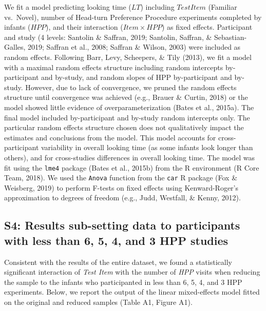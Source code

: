 \begin{appendix}
We fit a model predicting looking time (\(LT\)) including \(TestItem\)
(Familiar vs.~Novel), number of Head-turn Preference Procedure
experiments completed by infants (\(HPP\)), and their interaction
(\(Item \times HPP\)) as fixed effects. Participant and study (4 levels:
Santolin \& Saffran, 2019; Santolin, Saffran, \& Sebastian-Galles, 2019;
Saffran et al., 2008; Saffran \& Wilson, 2003) were included as random
effects. Following Barr, Levy, Scheepers, \& Tily (2013), we fit a model
with a maximal random effects structure including random intercepts
by-participant and by-study, and random slopes of HPP by-participant and
by-study. However, due to lack of convergence, we pruned the random
effects structure until convergence was achieved (e.g., Brauer \&
Curtin, 2018) or the model showed little evidence of
overparameterization (Bates et al., 2015a). The final model included
by-participant and by-study random intercepts only. The particular
random effects structure chosen does not qualitatively impact the
estimates and conclusions from the model. This model accounts for
cross-participant variability in overall looking time (as some infants
look longer than others), and for cross-studies differences in overall
looking time. The model was fit using the \texttt{lme4} package (Bates
et al., 2015b) from the R environment (R Core Team, 2018). We used the
\texttt{Anova} function from the \texttt{car} R package (Fox \&
Weisberg, 2019) to perform F-tests on fixed effects using
Kenward-Roger's approximation to degrees of freedom (e.g., Judd,
Westfall, \& Kenny, 2012).

\hypertarget{s4-results-sub-setting-data-to-participants-with-less-than-6-5-4-and-3-hpp-studies}{%
\subsection{S4: Results sub-setting data to participants with less than
6, 5, 4, and 3 HPP
studies}\label{s4-results-sub-setting-data-to-participants-with-less-than-6-5-4-and-3-hpp-studies}}

Consistent with the results of the entire dataset, we found a
statistically significant interaction of \emph{Test Item} with the
number of \emph{HPP} visits when reducing the sample to the infants who
participanted in less than 6, 5, 4, and 3 HPP experiments. Below, we
report the output of the linear mixed-effects model fitted on the
original and reduced samples (Table A1, Figure A1).


\end{appendix}
